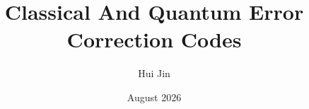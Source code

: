 \documentclass[12pt]{article}
\begin{document}
\title{Classical And Quantum Error Correction Codes}


\author{Hui Jin}
\date{August 2026}

%
\newpage 

%
\newpage 

%
\newpage 

%
\newpage

%
\newpage

%
\newpage

%
\newpage


\newpage

%
\newpage

%
\newpage

%
\newpage

%
\newpage

%
\newpage


\newpage

%
\newpage

%
\newpage

%
\newpage

%
\newpage
\end{document}
